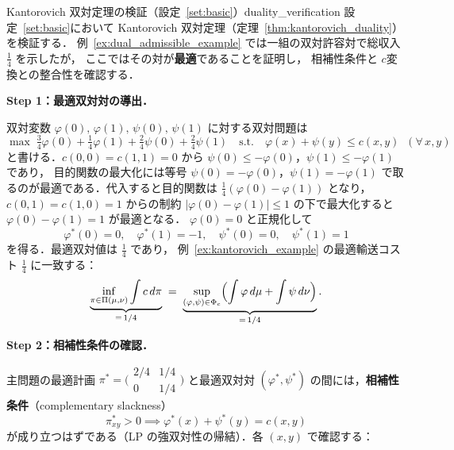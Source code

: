 \documentclass[uplatex, dvipdfmx]{jsarticle}
\begin{document}
\begin{example}{Kantorovich 双対定理の検証（設定~\ref{set:basic}）}{duality_verification}
設定~\ref{set:basic}において Kantorovich 双対定理（定理~\ref{thm:kantorovich_duality}）を検証する．
例~\ref{ex:dual_admissible_example} では一組の双対許容対で総収入 $\tfrac{1}{4}$ を示したが，
ここではその対が\textbf{最適}であることを証明し，
相補性条件と $c$変換との整合性を確認する．

\medskip
\textbf{Step 1：最適双対対の導出．}\par\nobreak
双対変数 $\varphi(0),\,\varphi(1),\,\psi(0),\,\psi(1)$ に対する双対問題は
\[
  \max\;\tfrac{3}{4}\varphi(0)+\tfrac{1}{4}\varphi(1)
  +\tfrac{2}{4}\psi(0)+\tfrac{2}{4}\psi(1)
  \quad\text{s.t.}\quad \varphi(x)+\psi(y)\le c(x,y)\;\;(\forall\,x,y)
\]
と書ける．$c(0,0)=c(1,1)=0$ から
$\psi(0)\le -\varphi(0)$，$\psi(1)\le -\varphi(1)$ であり，
目的関数の最大化には等号
$\psi(0)=-\varphi(0)$，$\psi(1)=-\varphi(1)$
で取るのが最適である．代入すると目的関数は $\tfrac{1}{4}(\varphi(0)-\varphi(1))$ となり，
$c(0,1)=c(1,0)=1$ からの制約 $|\varphi(0)-\varphi(1)|\le 1$ の下で最大化すると
$\varphi(0)-\varphi(1)=1$ が最適となる．
$\varphi(0)=0$ と正規化して
\[
  \boxed{\varphi^*(0)=0,\quad \varphi^*(1)=-1,\quad
  \psi^*(0)=0,\quad \psi^*(1)=1}
\]
を得る．最適双対値は $\tfrac{1}{4}$ であり，
例~\ref{ex:kantorovich_example} の最適輸送コスト $\tfrac{1}{4}$ に一致する：
\[
  \underbrace{\inf_{\pi\in\Pi(\mu,\nu)}\int c\,d\pi}_{=\,1/4}
  \;=\;
  \underbrace{\sup_{(\varphi,\psi)\in\Phi_c}
  \Bigl(\int\varphi\,d\mu+\int\psi\,d\nu\Bigr)}_{=\,1/4}.
\]

\medskip
\textbf{Step 2：相補性条件の確認．}\par\nobreak
主問題の最適計画
$\pi^*=\bigl(\begin{smallmatrix}2/4 & 1/4\\0 & 1/4\end{smallmatrix}\bigr)$
と最適双対対 $(\varphi^*,\psi^*)$ の間には，\textbf{相補性条件}（complementary slackness）
\[
  \pi^*_{xy}>0 \implies \varphi^*(x)+\psi^*(y)=c(x,y)
\]
が成り立つはずである（LP の強双対性の帰結）．各 $(x,y)$ で確認する：

\begin{center}
\end{center}
\end{example}
\end{document}

